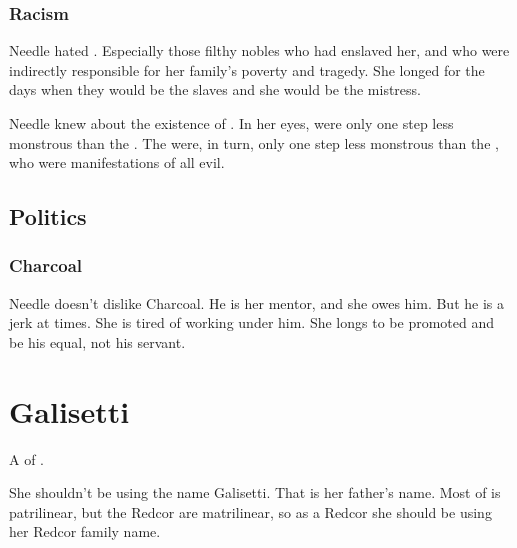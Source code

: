 \subsubsection{Racism}
Needle hated \scathae. 
Especially those filthy nobles who had enslaved her, and who were indirectly responsible for her family's poverty and tragedy. 
She longed for the days when they would be the slaves and she would be the mistress. 

Needle knew about the existence of \quiljaaran \serpentmen. 
In her eyes, \scathae were only one step less monstrous than the \serpentmen. 
The \serpentmen were, in turn, only one step less monstrous than the \dragons, who were manifestations of all evil. 









\subsection{Politics}
\subsubsection{Charcoal}
Needle doesn't dislike Charcoal. 
He is her mentor, and she owes him. 
But he is a jerk at times. 
She is tired of working under him. 
She longs to be promoted and be his equal, not his servant. 















\section{\Racel Galisetti}
A \soror{} of . 

She shouldn't be using the name Galisetti. 
That is her father's name. 
Most of \Velcad{} is patrilinear, but the Redcor are matrilinear, so as a Redcor she should be using her Redcor family name. 
















